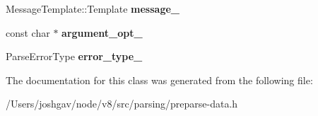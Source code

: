 \begin{DoxyCompactItemize}
\item 
Message\+Template\+::\+Template {\bfseries message\+\_\+}\hypertarget{classv8_1_1internal_1_1_singleton_logger_ae87dd5176d4d28b514b5b29bd5642867}{}\label{classv8_1_1internal_1_1_singleton_logger_ae87dd5176d4d28b514b5b29bd5642867}

\item 
const char $\ast$ {\bfseries argument\+\_\+opt\+\_\+}\hypertarget{classv8_1_1internal_1_1_singleton_logger_a5fc9b51d94cc21e4c499c80935dc63e7}{}\label{classv8_1_1internal_1_1_singleton_logger_a5fc9b51d94cc21e4c499c80935dc63e7}

\item 
Parse\+Error\+Type {\bfseries error\+\_\+type\+\_\+}\hypertarget{classv8_1_1internal_1_1_singleton_logger_af14dca6849595eed12775e303248fef4}{}\label{classv8_1_1internal_1_1_singleton_logger_af14dca6849595eed12775e303248fef4}

\end{DoxyCompactItemize}


The documentation for this class was generated from the following file\+:\begin{DoxyCompactItemize}
\item 
/\+Users/joshgav/node/v8/src/parsing/preparse-\/data.\+h\end{DoxyCompactItemize}
